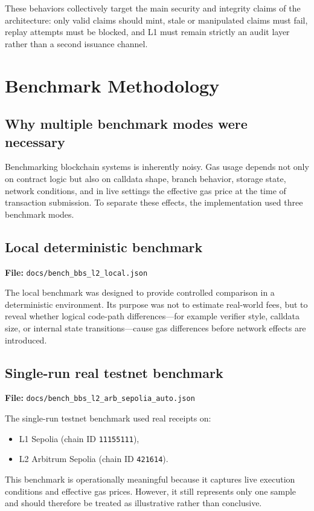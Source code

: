 \documentclass[11pt]{article}
\begin{document}
These behaviors collectively target the main security and integrity claims of the architecture: only valid claims should mint, stale or manipulated claims must fail, replay attempts must be blocked, and L1 must remain strictly an audit layer rather than a second issuance channel.

\section{Benchmark Methodology}

\subsection{Why multiple benchmark modes were necessary}
Benchmarking blockchain systems is inherently noisy. Gas usage depends not only on contract logic but also on calldata shape, branch behavior, storage state, network conditions, and in live settings the effective gas price at the time of transaction submission. To separate these effects, the implementation used three benchmark modes.

\subsection{Local deterministic benchmark}
\textbf{File:} \texttt{docs/bench\_bbs\_l2\_local.json}

The local benchmark was designed to provide controlled comparison in a deterministic environment. Its purpose was not to estimate real-world fees, but to reveal whether logical code-path differences---for example verifier style, calldata size, or internal state transitions---cause gas differences before network effects are introduced.

\subsection{Single-run real testnet benchmark}
\textbf{File:} \texttt{docs/bench\_bbs\_l2\_arb\_sepolia\_auto.json}

The single-run testnet benchmark used real receipts on:

\begin{itemize}
  \item L1 Sepolia (chain ID \texttt{11155111}),
  \item L2 Arbitrum Sepolia (chain ID \texttt{421614}).
\end{itemize}

This benchmark is operationally meaningful because it captures live execution conditions and effective gas prices. However, it still represents only one sample and should therefore be treated as illustrative rather than conclusive.
\end{document}
